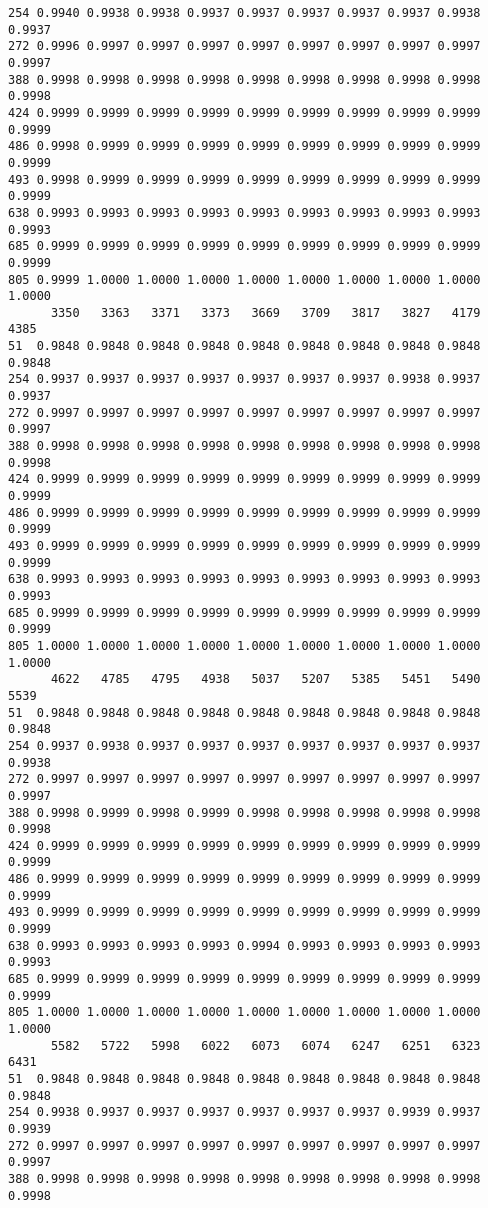 \documentclass[
]{report}
\begin{document}
\begin{verbatim}
254 0.9940 0.9938 0.9938 0.9937 0.9937 0.9937 0.9937 0.9937 0.9938 0.9937
272 0.9996 0.9997 0.9997 0.9997 0.9997 0.9997 0.9997 0.9997 0.9997 0.9997
388 0.9998 0.9998 0.9998 0.9998 0.9998 0.9998 0.9998 0.9998 0.9998 0.9998
424 0.9999 0.9999 0.9999 0.9999 0.9999 0.9999 0.9999 0.9999 0.9999 0.9999
486 0.9998 0.9999 0.9999 0.9999 0.9999 0.9999 0.9999 0.9999 0.9999 0.9999
493 0.9998 0.9999 0.9999 0.9999 0.9999 0.9999 0.9999 0.9999 0.9999 0.9999
638 0.9993 0.9993 0.9993 0.9993 0.9993 0.9993 0.9993 0.9993 0.9993 0.9993
685 0.9999 0.9999 0.9999 0.9999 0.9999 0.9999 0.9999 0.9999 0.9999 0.9999
805 0.9999 1.0000 1.0000 1.0000 1.0000 1.0000 1.0000 1.0000 1.0000 1.0000
      3350   3363   3371   3373   3669   3709   3817   3827   4179   4385
51  0.9848 0.9848 0.9848 0.9848 0.9848 0.9848 0.9848 0.9848 0.9848 0.9848
254 0.9937 0.9937 0.9937 0.9937 0.9937 0.9937 0.9937 0.9938 0.9937 0.9937
272 0.9997 0.9997 0.9997 0.9997 0.9997 0.9997 0.9997 0.9997 0.9997 0.9997
388 0.9998 0.9998 0.9998 0.9998 0.9998 0.9998 0.9998 0.9998 0.9998 0.9998
424 0.9999 0.9999 0.9999 0.9999 0.9999 0.9999 0.9999 0.9999 0.9999 0.9999
486 0.9999 0.9999 0.9999 0.9999 0.9999 0.9999 0.9999 0.9999 0.9999 0.9999
493 0.9999 0.9999 0.9999 0.9999 0.9999 0.9999 0.9999 0.9999 0.9999 0.9999
638 0.9993 0.9993 0.9993 0.9993 0.9993 0.9993 0.9993 0.9993 0.9993 0.9993
685 0.9999 0.9999 0.9999 0.9999 0.9999 0.9999 0.9999 0.9999 0.9999 0.9999
805 1.0000 1.0000 1.0000 1.0000 1.0000 1.0000 1.0000 1.0000 1.0000 1.0000
      4622   4785   4795   4938   5037   5207   5385   5451   5490   5539
51  0.9848 0.9848 0.9848 0.9848 0.9848 0.9848 0.9848 0.9848 0.9848 0.9848
254 0.9937 0.9938 0.9937 0.9937 0.9937 0.9937 0.9937 0.9937 0.9937 0.9938
272 0.9997 0.9997 0.9997 0.9997 0.9997 0.9997 0.9997 0.9997 0.9997 0.9997
388 0.9998 0.9999 0.9998 0.9999 0.9998 0.9998 0.9998 0.9998 0.9998 0.9998
424 0.9999 0.9999 0.9999 0.9999 0.9999 0.9999 0.9999 0.9999 0.9999 0.9999
486 0.9999 0.9999 0.9999 0.9999 0.9999 0.9999 0.9999 0.9999 0.9999 0.9999
493 0.9999 0.9999 0.9999 0.9999 0.9999 0.9999 0.9999 0.9999 0.9999 0.9999
638 0.9993 0.9993 0.9993 0.9993 0.9994 0.9993 0.9993 0.9993 0.9993 0.9993
685 0.9999 0.9999 0.9999 0.9999 0.9999 0.9999 0.9999 0.9999 0.9999 0.9999
805 1.0000 1.0000 1.0000 1.0000 1.0000 1.0000 1.0000 1.0000 1.0000 1.0000
      5582   5722   5998   6022   6073   6074   6247   6251   6323   6431
51  0.9848 0.9848 0.9848 0.9848 0.9848 0.9848 0.9848 0.9848 0.9848 0.9848
254 0.9938 0.9937 0.9937 0.9937 0.9937 0.9937 0.9937 0.9939 0.9937 0.9939
272 0.9997 0.9997 0.9997 0.9997 0.9997 0.9997 0.9997 0.9997 0.9997 0.9997
388 0.9998 0.9998 0.9998 0.9998 0.9998 0.9998 0.9998 0.9998 0.9998 0.9998

\end{verbatim}
\end{document}
